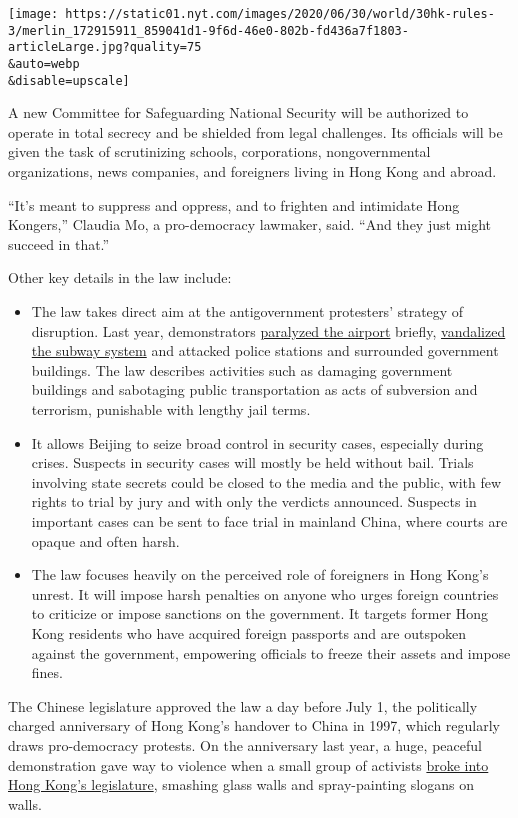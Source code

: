 \texttt{[image: https://static01.nyt.com/images/2020/06/30/world/30hk-rules-3/merlin\_172915911\_859041d1-9f6d-46e0-802b-fd436a7f1803-articleLarge.jpg?quality=75\\\&auto=webp\\\&disable=upscale]}

A new Committee for Safeguarding National Security will be authorized to
operate in total secrecy and be shielded from legal challenges. Its
officials will be given the task of scrutinizing schools, corporations,
nongovernmental organizations, news companies, and foreigners living in
Hong Kong and abroad.

``It's meant to suppress and oppress, and to frighten and intimidate
Hong Kongers,'' Claudia Mo, a pro-democracy lawmaker, said. ``And they
just might succeed in that.''

Other key details in the law include:

\begin{itemize}
\item
  The law takes direct aim at the antigovernment protesters' strategy of
  disruption. Last year, demonstrators
  \href{https://www.nytimes.com/2019/08/14/business/hong-kong-economy-airport-protests.html}{paralyzed
  the airport} briefly,
  \href{https://www.nytimes.com/2019/10/07/world/asia/hong-kong-protesters-masks-violence.html}{vandalized
  the subway system} and attacked police stations and surrounded
  government buildings. The law describes activities such as damaging
  government buildings and sabotaging public transportation as acts of
  subversion and terrorism, punishable with lengthy jail terms.
\item
  It allows Beijing to seize broad control in security cases, especially
  during crises. Suspects in security cases will mostly be held without
  bail. Trials involving state secrets could be closed to the media and
  the public, with few rights to trial by jury and with only the
  verdicts announced. Suspects in important cases can be sent to face
  trial in mainland China, where courts are opaque and often harsh.
\item
  The law focuses heavily on the perceived role of foreigners in Hong
  Kong's unrest. It will impose harsh penalties on anyone who urges
  foreign countries to criticize or impose sanctions on the government.
  It targets former Hong Kong residents who have acquired foreign
  passports and are outspoken against the government, empowering
  officials to freeze their assets and impose fines.
\end{itemize}

The Chinese legislature approved the law a day before July 1, the
politically charged anniversary of Hong Kong's handover to China in
1997, which regularly draws pro-democracy protests. On the anniversary
last year, a huge, peaceful demonstration gave way to violence when a
small group of activists
\href{https://www.nytimes.com/2019/07/01/world/asia/china-hong-kong-protest.html}{broke
into Hong Kong's legislature}, smashing glass walls and spray-painting
slogans on walls.

